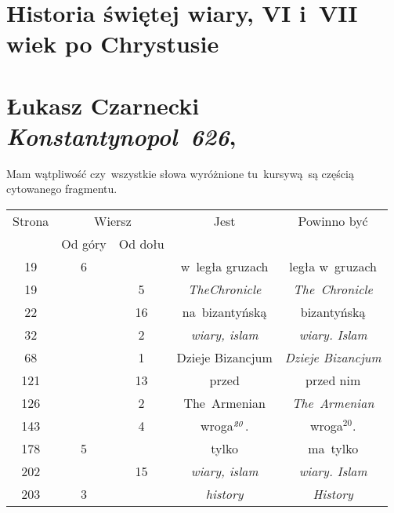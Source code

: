 \documentclass[a4paper,11pt]{article}
\numberwithin{equation}{section}
\begin{document}
\newpage

\section{Historia świętej wiary, VI i~VII wiek po Chrystusie}




\section{Łukasz Czarnecki \\
  \textit{Konstantynopol~626},
  \parencite{CzarneckiKonstantynopol626Wyd2017}}


\vspace{0em}




\noindent
{} Mam wątpliwość czy~wszystkie słowa wyróżnione
tu~kursywą~są częścią cytowanego fragmentu.

\VerSpaceFour







\begin{center}

  \begin{tabular}{|c|c|c|c|c|}
    \hline
    Strona & \multicolumn{2}{c|}{Wiersz} & Jest
                              & Powinno być \\ \cline{2-3}
    & Od góry & Od dołu & & \\
    \hline
    \hphantom{0}19 & \hphantom{0}6 & & w~legła gruzach & legła w~gruzach \\
    \hphantom{0}19 & & \hphantom{0}5 & \textit{TheChronicle}
    & \textit{The~Chronicle} \\
    \hphantom{0}22 & & 16 & na~bizantyńską & bizantyńską \\
    \hphantom{0}32 & & \hphantom{0}2 & \textit{wiary, islam}
    & \textit{wiary. Islam} \\
    \hphantom{0}68 & & \hphantom{0}1 & Dzieje Bizancjum
    & \textit{Dzieje Bizancjum} \\
    121 & & 13 & przed & przed nim \\
    126 & & \hphantom{0}2 & The~Armenian & \textit{The~Armenian} \\
    143 & & \hphantom{0}4 & wroga$^{ \textrm{\textit{20}} }$.
    & wroga$^{ 20 }$. \\
    178 & \hphantom{0}5 & & tylko & ma~tylko \\
    202 & & 15 & \textit{wiary, islam} & \textit{wiary. Islam} \\
    203 & \hphantom{0}3 & & \textit{history} & \textit{History} \\
    \hline
  \end{tabular}

\end{center}
\end{document}
